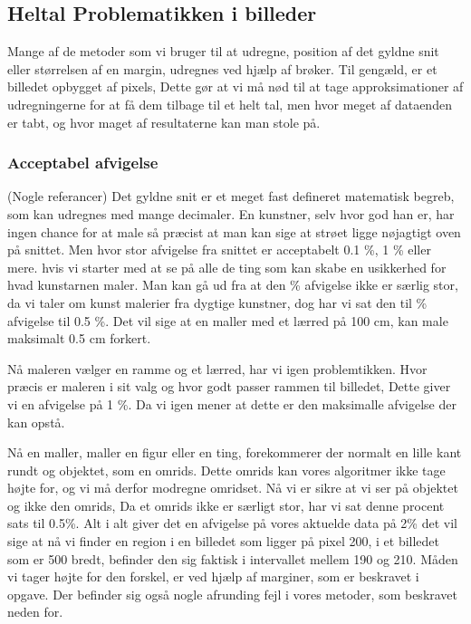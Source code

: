 \subsection*{Heltal Problematikken i billeder}
Mange af de metoder som vi bruger til at udregne, position af det gyldne
snit eller størrelsen af en margin, udregnes ved hjælp af brøker.
Til gengæld, er et billedet opbygget af pixels, Dette gør at vi må nød
til at tage approksimationer af udregningerne for at få dem tilbage til et
helt tal, men hvor meget af dataenden er tabt, og hvor maget af
resultaterne kan man stole på.

\subsubsection{Acceptabel afvigelse}
(Nogle referancer)
Det gyldne snit er et meget fast defineret matematisk begreb, som kan
udregnes med mange decimaler. En kunstner, selv hvor god han er, har
ingen chance for at male så præcist at man kan sige at strøet ligge
nøjagtigt oven på snittet. Men hvor stor afvigelse fra snittet er
acceptabelt 0.1 \%, 1 \% eller mere. hvis vi starter med at se på alle
de ting som kan skabe en usikkerhed for hvad kunstarnen maler. Man kan
gå ud fra at den \% afvigelse ikke er særlig stor, da vi taler om kunst
malerier fra dygtige kunstner, dog har vi sat den til \% afvigelse til
0.5 \%. Det vil sige at en maller med et lærred på 100 cm, kan male
maksimalt 0.5 cm forkert.

Nå maleren vælger en ramme og et lærred, har vi igen problemtikken. Hvor
præcis er maleren i sit valg og hvor godt passer rammen til billedet,
Dette giver vi en afvigelse på 1 \%. Da vi igen mener at dette er den
maksimalle afvigelse der kan opstå.

Nå en maller, maller en figur eller en ting, forekommerer der normalt en
lille kant rundt og objektet, som en omrids. Dette omrids kan vores
algoritmer ikke tage højte for, og vi må derfor modregne omridset. Nå vi
er sikre at vi ser på objektet og ikke den omrids, Da et omrids ikke er
særligt stor, har vi sat denne procent sats til 0.5\%. Alt i alt giver
det en afvigelse på vores aktuelde data på 2\% det vil sige at nå vi
finder en region i en billedet som ligger på pixel 200, i et billedet
som er 500 bredt, befinder den sig faktisk i intervallet mellem 190 og
210. Måden vi tager højte for den forskel, er ved hjælp af marginer, som
er beskravet i opgave. Der befinder sig også nogle afrunding fejl i
vores metoder, som beskravet neden for.


